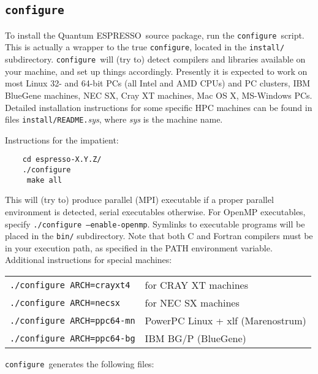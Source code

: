 \documentclass[12pt,a4paper]{article}
\def\qe{{\sc Quantum ESPRESSO}}
\def\configure{\texttt{configure}}
\begin{document}
\subsection{\configure}

To install the \qe\ source package, run the \configure{}ript. This is actually a wrapper to the true \configure,
located in the \texttt{install/} subdirectory. \configure\
will (try to) detect compilers and libraries available on
your machine, and set up things accordingly. Presently it is expected
to work on most Linux 32- and 64-bit PCs (all Intel and AMD CPUs) and
PC clusters, IBM BlueGene machines, NEC SX, Cray XT
machines, Mac OS X, MS-Windows PCs. Detailed installation instructions for some
specific HPC machines can be found in files \texttt{install/README.}{\em sys},
where {\em sys} is the machine name.

Instructions for the impatient:
\begin{verbatim}
    cd espresso-X.Y.Z/
    ./configure
     make all
\end{verbatim}
This will (try to) produce parallel (MPI) executable if a proper parallel
environment is detected, serial executables otherwise. For OpenMP executables,
specify \texttt{./configure --enable-openmp}. Symlinks to executable programs
will be placed in the \texttt{bin/}
subdirectory. Note that both C and Fortran compilers must be in your execution
path, as specified in the PATH environment variable.
Additional instructions for special machines:

\begin{tabular}{ll}
    \texttt{./configure ARCH=crayxt4}& for CRAY XT machines \\
    \texttt{./configure ARCH=necsx}   & for NEC SX machines \\
    \texttt{./configure ARCH=ppc64-mn}& PowerPC Linux + xlf (Marenostrum) \\
    \texttt{./configure ARCH=ppc64-bg}& IBM BG/P (BlueGene)
\end{tabular}

\noindent \configure\ generates the following files:
\end{document}
